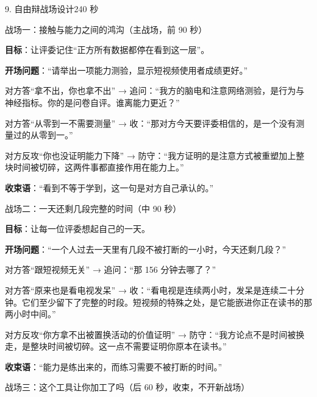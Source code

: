 \documentclass[script,con]{debate}
\begin{document}
\begin{stage}{9. 自由辩战场设计}{240 秒}
\begin{battleground}{战场一：接触与能力之间的鸿沟（主战场，前 90 秒）}
\begin{bullets}
\item \textbf{目标}：让评委记住“正方所有数据都停在看到这一层”。
\item \textbf{开场问题}：“请举出一项能力测验，显示短视频使用者成绩更好。”
\item 对方答“拿不出，你也拿不出” → 追问：“我方的脑电和注意网络测验，是行为与神经指标。你的是问卷自评。谁离能力更近？”
\item 对方答“从零到一不需要测量” → 收：“那对方今天要评委相信的，是一个没有测量过的从零到一。”
\item 对方反攻“你也没证明能力下降” → 防守：“我方证明的是注意方式被重塑加上整块时间被切碎，这两件事都直接作用在能力上。”
\item \textbf{收束语}：“看到不等于学到，这一句是对方自己承认的。”
\end{bullets}
\end{battleground}
\begin{battleground}{战场二：一天还剩几段完整的时间（中 90 秒）}
\begin{bullets}
\item \textbf{目标}：让每一位评委想起自己的一天。
\item \textbf{开场问题}：“一个人过去一天里有几段不被打断的一小时，今天还剩几段？”
\item 对方答“跟短视频无关” → 追问：“那 156 分钟去哪了？”
\item 对方答“原来也是看电视发呆” → 收：“看电视是连续两小时，发呆是连续二十分钟。它们至少留下了完整的时段。短视频的特殊之处，是它能嵌进你正在读书的那两小时中间。”
\item 对方反攻“你方拿不出被置换活动的价值证明” → 防守：“我方论点不是时间被换走，是整块时间被切碎。这一点不需要证明你原本在读书。”
\item \textbf{收束语}：“能力是练出来的，而练习需要不被打断的时间。”
\end{bullets}
\end{battleground}
\begin{battleground}{战场三：这个工具让你加工了吗（后 60 秒，收束，不开新战场）}
\begin{fields}

\end{fields}
\end{battleground}
\end{stage}
\end{document}
